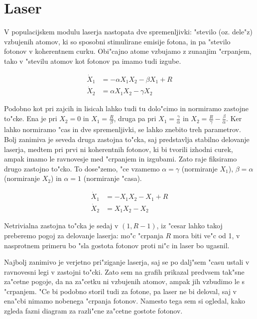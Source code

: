\documentclass[a4paper,10pt]{article}
\begin{document}
\clearpage
\section{Laser}

V populacijskem modulu laserja nastopata dve spremenljivki: "stevilo (oz. dele"z) vzbujenih atomov, ki so sposobni stimulirane emisije fotona, in pa "stevilo fotonov v koherentnem curku. Obi"cajno atome vzbujamo z zunanjim "crpanjem, tako v "stevilu atomov kot fotonov pa imamo tudi izgube. 

\begin{align}
  \dot X_1 &= -\alpha X_1 X_2 - \beta X_1 + R \\
  \dot X_2 &= \alpha X_1 X_2 - \gamma X_2
\end{align}

Podobno kot pri zajcih in lisicah lahko tudi tu dolo"cimo in normiramo zastojne to"cke. Ena je pri $X_2=0$ in $X_1 = \frac{R}{\beta}$, druga pa pri $X_1 = \frac{\gamma}{\alpha}$ in $X_2 = \frac{R}{\gamma} - \frac{\beta}{\alpha}$. Ker lahko normiramo "cas in dve spremenljivki, se lahko znebito treh parametrov. Bolj zanimiva je seveda druga zastojna to"cka, saj predstavlja stabilno delovanje laserja, medtem pri prvi ni koherentnih fotonov, ki bi tvorili izhodni curek, ampak imamo le ravnovesje med "crpanjem in izgubami. Zato raje fiksiramo drugo zastojno to"cko. To dose"zemo, "ce vzamemo $\alpha=\gamma$ (normiranje $X_1$), $\beta=\alpha$ (normiranje $X_2$) in $\alpha=1$ (normiranje "casa). 

\begin{align}
  \dot X_1 &= -X_1 X_2 - X_1 + R \\
  \dot X_2 &= X_1 X_2 - X_2
\end{align}

Netrivialna zastojna to"cka je sedaj v $(1,R-1)$, iz "cesar lahko takoj preberemo pogoj za delovanje laserja: mo"c "crpanja $R$ mora biti ve"c od 1, v nasprotnem primeru bo "sla gostota fotonov proti ni"c in laser bo ugasnil. 

Najbolj zanimivo je verjetno pri"ziganje laserja, saj se po dalj"sem "casu ustali v ravnovesni legi v zastojni to"cki. Zato sem na grafih prikazal predvsem tak"sne za"cetne pogoje, da na za"cetku ni vzbujenih atomov, ampak jih vzbudimo le s "crpanjem. "Ce bi podobno storil tudi za fotone, pa laser ne bi deloval, saj v ena"cbi nimamo nobenega "crpanja fotonov. Namesto tega sem si ogledal, kako zgleda fazni diagram za razli"cne za"cetne gostote fotonov. 

\clearpage
\end{document}
